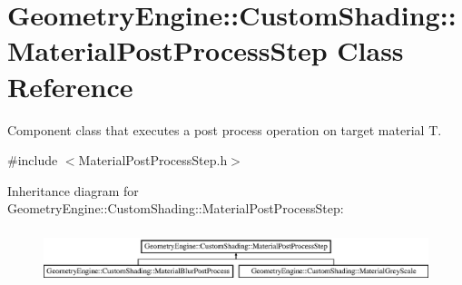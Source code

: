 \hypertarget{class_geometry_engine_1_1_custom_shading_1_1_material_post_process_step}{}\section{Geometry\+Engine\+::Custom\+Shading\+::Material\+Post\+Process\+Step Class Reference}
\label{class_geometry_engine_1_1_custom_shading_1_1_material_post_process_step}


Component class that executes a post process operation on target material T.  




{\ttfamily \#include $<$Material\+Post\+Process\+Step.\+h$>$}

Inheritance diagram for Geometry\+Engine\+::Custom\+Shading\+::Material\+Post\+Process\+Step\+:\begin{figure}[H]
\begin{center}
\leavevmode
\includegraphics[height=1.586402cm]{class_geometry_engine_1_1_custom_shading_1_1_material_post_process_step}
\end{center}
\end{figure}
